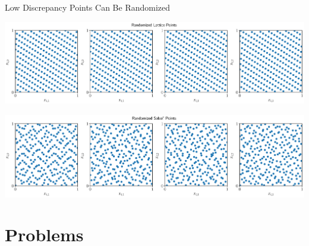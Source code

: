 \documentclass[10pt,compress,xcolor={usenames,dvipsnames},aspectratio=169]{beamer}
\begin{document}
\begin{frame}{Low Discrepancy Points Can Be Randomized}
	\vspace{-3.2ex}

	\includegraphics[width=\textwidth]{latticeptsrand.eps}

	\vspace{-4.3ex}

	\includegraphics[width=\textwidth]{sobolptsrand.eps}


\end{frame}

\section{Problems}
\end{document}
